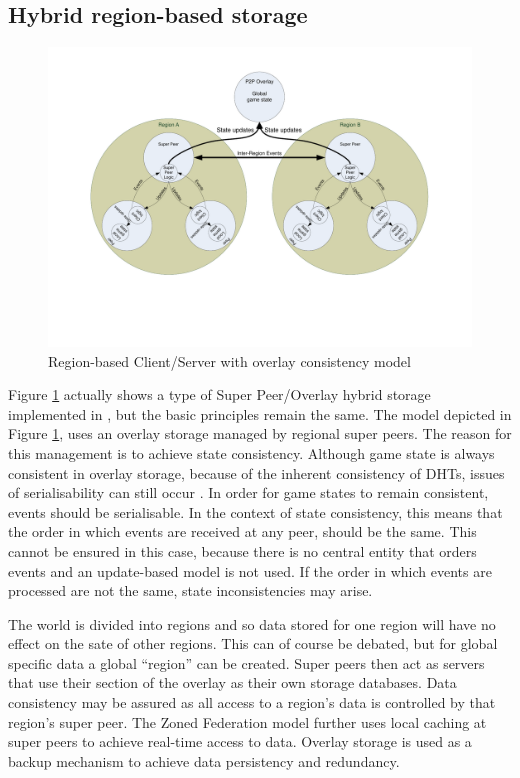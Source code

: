 \documentclass[10pt,a4paper,journal,cspaper,compsoc]{IEEEtran}
\begin{document}
\subsection{Hybrid region-based storage}

\begin{figure}[htbp]
 \centering
 \includegraphics[clip=true, viewport=2cm 5cm 27cm 19.5cm, width=\textwidth]{region_based_CS_CM_P2PO}
 \caption{Region-based Client/Server with overlay consistency model}
 \label{fig_cs_region_o_cm}
\end{figure}
%
 Figure \ref{fig_cs_region_o_cm} actually shows a type of Super Peer/Overlay hybrid storage implemented in \cite{zoned_federation}, but the
basic principles remain the same. The model depicted in Figure \ref{fig_cs_region_o_cm}, uses an overlay storage managed by regional super peers. The
reason for this management is to achieve state consistency. Although game state is always consistent in overlay storage, because of the inherent
consistency of DHTs, issues of serialisability can still occur \cite{zoned_federation}. In order for game states to remain consistent, events should
be serialisable. In the context of state consistency, this means that the order in which events are received at any peer, should be the same. This
cannot be ensured in this case, because there is no central entity that orders events and an update-based model is not used. If the order in which
events are processed are not the same, state inconsistencies may arise.

The world is divided into regions and so data stored for one region will have no effect on the sate of other regions. This can of course be debated,
but for global specific data a global ``region'' can be created. Super peers then act as servers that use their section of the overlay as their own
storage databases. Data consistency may be assured as all access to a region's data is controlled by that region's super peer. The Zoned Federation
model further uses local caching at super peers to achieve real-time access to data. Overlay storage is used as a backup mechanism to achieve data
persistency and redundancy.
\end{document}
